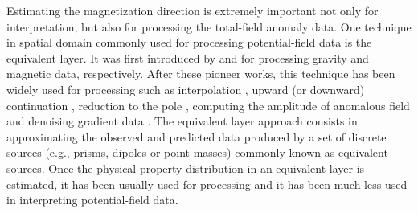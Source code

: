 Estimating the magnetization direction is extremely important not only for interpretation, but also for processing the total-field anomaly data. One technique in spatial domain commonly used for processing potential-field data is the equivalent layer. It was first introduced by \cite{dampney1969} and \cite{emilia_massey_1974} for processing gravity and magnetic data, respectively. After these pioneer works, this technique has been widely used for processing such as interpolation \citep{cordell_1992,mendonca-silva_1994,barnes-lumley_2011,siqueira_etal_2017}, upward (or downward) continuation  \citep{hansen-miyazaki_1984,li-oldenburg_2010}, reduction to the pole \citep{silva_1986,leao-silva_1989,guspi-novara_2009,oliveirajr-etal_2013}, computing the amplitude of anomalous field \citep{li_li_2014} and denoising gradient data \citep{martinez_li_2016}. The equivalent layer approach consists in approximating the observed and predicted data produced by a set of discrete sources (e.g., prisms, dipoles or point masses) commonly known as equivalent sources. Once the physical property distribution in an equivalent layer is estimated, it has been usually used for processing and it has been much less used in interpreting potential-field data. 

